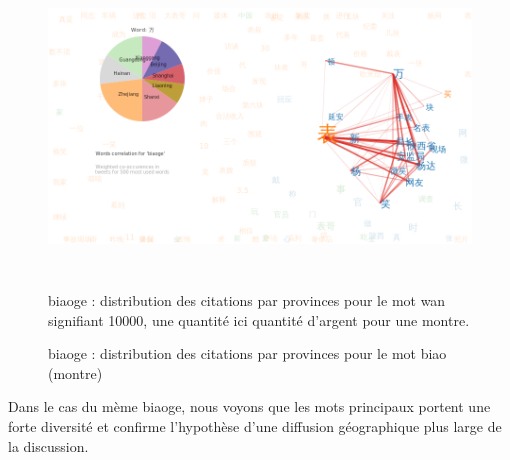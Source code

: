 \begin{figure}
    \centering
    \includegraphics[width=6.0087in,height=3.3386in]{figures/chap4/chapitre4-img59.png}
    \caption{
      biaoge : distribution des citations par provinces pour le mot wan signifiant 10000, une quantit\'e ici quantit\'e d{\textquoteright}argent pour une montre.
    }
\end{figure}
 



\begin{figure}
    \centering
  \caption{
     biaoge : distribution des citations par provinces pour le mot biao (montre)
  }
\end{figure}


Dans le cas du m\`eme biaoge, nous voyons que les mots principaux
portent une forte diversit\'e et confirme l{\textquoteright}hypoth\`ese
d{\textquoteright}une diffusion g\'eographique plus large de la
discussion.


